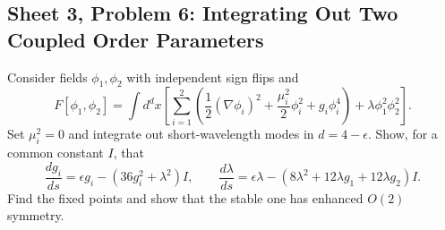 \subsection{Sheet 3, Problem 6: Integrating Out Two Coupled Order Parameters}

Consider fields $\phi_1,\phi_2$ with independent sign flips and
\begin{equation}
    F[\phi_1,\phi_2]=\int d^dx\left[
    \sum_{i=1}^2\left(
    \frac12(\nabla\phi_i)^2+\frac{\mu_i^2}{2}\phi_i^2
    +g_i\phi_i^4\right)+\lambda\phi_1^2\phi_2^2\right].
\end{equation}
Set $\mu_i^2=0$ and integrate out short-wavelength modes in
$d=4-\epsilon$. Show, for a common constant $I$, that
\begin{equation}
    \frac{dg_i}{ds}=\epsilon g_i-(36g_i^2+\lambda^2)I,
    \qquad
    \frac{d\lambda}{ds}
    =\epsilon\lambda-(8\lambda^2+12\lambda g_1
    +12\lambda g_2)I.
\end{equation}
Find the fixed points and show that the stable one has enhanced
$O(2)$ symmetry.
